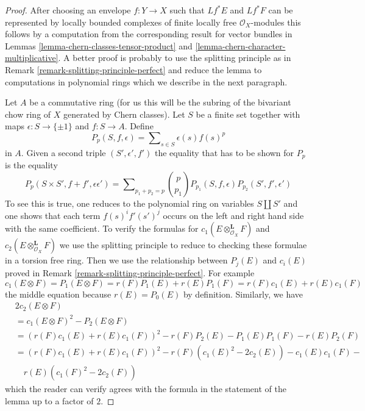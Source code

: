 \begin{proof}
After choosing an envelope $f : Y \to X$ such that $Lf^*E$ and $Lf^*F$
can be represented by locally bounded complexes of finite locally
free $\mathcal{O}_X$-modules this follows by a computation from the
corresponding result for vector bundles in
Lemmas \ref{lemma-chern-classes-tensor-product} and
\ref{lemma-chern-character-multiplicative}.
A better proof is probably to use the splitting principle as in
Remark \ref{remark-splitting-principle-perfect}
and reduce the lemma to computations in polynomial rings 
which we describe in the next paragraph.

\medskip\noindent
Let $A$ be a commutative ring (for us this will be the subring of the
bivariant chow ring of $X$ generated by Chern classes).
Let $S$ be a finite set together with maps $\epsilon : S \to \{\pm 1\}$
and $f : S \to A$. Define
$$
P_p(S, f , \epsilon) = \sum\nolimits_{s \in S} \epsilon(s) f(s)^p
$$
in $A$. Given a second triple $(S', \epsilon', f')$
the equality that has to be shown for $P_p$ is the equality
$$
P_p(S \times S', f + f' , \epsilon \epsilon') = 
\sum\nolimits_{p_1 + p_2 = p}
{p \choose p_1} P_{p_1}(S, f, \epsilon) P_{p_2}(S', f', \epsilon')
$$
To see this is true, one reduces to the polynomial ring on variables
$S \amalg S'$ and one shows that each term $f(s)^if'(s')^j$ occurs
on the left and right hand side with the same coefficient.
To verify the formulas for $c_1(E \otimes_{\mathcal{O}_X}^\mathbf{L} F)$
and $c_2(E \otimes_{\mathcal{O}_X}^\mathbf{L} F)$ we use the splitting
principle to reduce to checking these formulae in a torsion free ring.
Then we use the relationship between $P_j(E)$ and $c_i(E)$ proved
in Remark \ref{remark-splitting-principle-perfect}. For example
$$
c_1(E \otimes F) = P_1(E \otimes F) = r(F)P_1(E) + r(E)P_1(F) =
r(F)c_1(E) + r(E)c_1(F)
$$
the middle equation because $r(E) = P_0(E)$ by definition. Similarly, we have
\begin{align*}
& 2c_2(E \otimes F) \\
& = c_1(E \otimes F)^2 - P_2(E \otimes F) \\
& =
(r(F)c_1(E) + r(E)c_1(F))^2 -
r(F)P_2(E) - P_1(E)P_1(F) - r(E)P_2(F) \\
& =
(r(F)c_1(E) + r(E)c_1(F))^2 -
r(F)(c_1(E)^2 - 2c_2(E)) - c_1(E)c_1(F) - \\
& \quad r(E)(c_1(F)^2 - 2c_2(F))
\end{align*}
which the reader can verify agrees with the formula in the statement
of the lemma up to a factor of $2$.
\end{proof}







